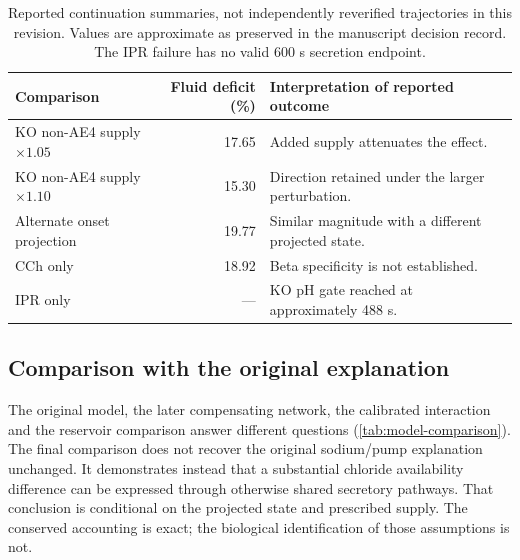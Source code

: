 \documentclass[11pt]{article}
\begin{document}
\begin{table}[t]
\centering
\caption{Reported continuation summaries, not independently reverified trajectories in this revision. Values are approximate as preserved in the manuscript decision record. The IPR failure has no valid 600 s secretion endpoint.}
\label{tab:reported-sensitivities}
\begin{tabularx}{\textwidth}{l r X}
\toprule
Comparison & Fluid deficit (\%) & Interpretation of reported outcome\\
\midrule
KO non-AE4 supply $\times1.05$ & 17.65 & Added supply attenuates the effect.\\
KO non-AE4 supply $\times1.10$ & 15.30 & Direction retained under the larger perturbation.\\
Alternate onset projection & 19.77 & Similar magnitude with a different projected state.\\
CCh only & 18.92 & Beta specificity is not established.\\
IPR only & --- & KO pH gate reached at approximately 488 s.\\
\bottomrule
\end{tabularx}
\end{table}

\subsection{Comparison with the original explanation}

The original model, the later compensating network, the calibrated interaction and the reservoir comparison answer different questions (\cref{tab:model-comparison}). The final comparison does not recover the original sodium/pump explanation unchanged. It demonstrates instead that a substantial chloride availability difference can be expressed through otherwise shared secretory pathways. That conclusion is conditional on the projected state and prescribed supply. The conserved accounting is exact; the biological identification of those assumptions is not.
\end{document}

